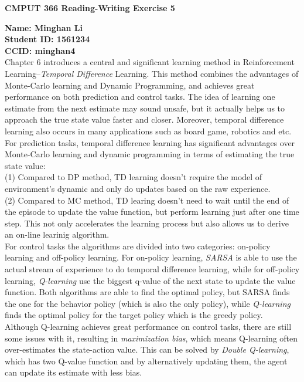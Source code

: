 \documentclass[12pt,a4paper]{article}
\begin{document}
\centerline{\large{\textbf{CMPUT 366 Reading-Writing Exercise 5}}}

\noindent \textbf{Name: Minghan Li}\\
\textbf{Student ID: 1561234}\\
\textbf{CCID: minghan4}\\

Chapter 6 introduces a central and significant learning method in Reinforcement Learning--\textit{Temporal Difference} Learning. This method combines the advantages of Monte-Carlo learning and Dynamic Programming, and achieves great performance on both prediction and control tasks. The idea of learning one estimate from the next estimate may sound unsafe, but it actually helps us to approach the true state value faster and closer. Moreover, temporal difference learning also occurs in many applications such as board game, robotics and etc.\\

For prediction tasks, temporal difference learning has significant advantages over Monte-Carlo learning and dynamic programming in terms of estimating the true state value:\\

(1) Compared to DP method, TD learning doesn't require the model of environment's dynamic and only do updates based on the raw experience.\\

(2) Compared to MC method, TD learing doesn't need to wait until the end of the episode to update the value function, but perform learning just after one time step. This not only accelerates the learning process but also allows us to derive an on-line learinig algorithm.\\

For control tasks the algorithms are divided into two categories: on-policy learning and off-policy learning. For on-policy learning, \textit{SARSA} is able to use the actual stream of experience to do temporal difference learning, while for off-policy learning, \textit{Q-learning} use the biggest q-value of the next state to update the value function. Both algorithms are able to find the optimal policy, but SARSA finds the one for the behavior policy (which is also the only policy), while \textit{Q-learning} finds the optimal policy for the target policy which is the greedy policy.\\

Although Q-learning achieves great performance on control tasks, there are still some issues with it, resulting in \textit{maximization bias}, which means Q-learning often over-estimates the state-action value. This can be solved by \textit{Double Q-learning}, which has two Q-value function and by alternatively updating them, the agent can update its estimate with less bias.\\
\end{document}
